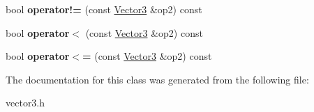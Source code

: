 \begin{DoxyCompactItemize}
\item 
\hypertarget{classpho_1_1Vector3_ab9a92218aa879dd463ef782044527798}{bool {\bfseries operator!=} (const \hyperlink{classpho_1_1Vector3}{Vector3} \&op2) const }\label{classpho_1_1Vector3_ab9a92218aa879dd463ef782044527798}

\item 
\hypertarget{classpho_1_1Vector3_ac5bb55b238f78040d7668d3d484deaab}{bool {\bfseries operator$<$} (const \hyperlink{classpho_1_1Vector3}{Vector3} \&op2) const }\label{classpho_1_1Vector3_ac5bb55b238f78040d7668d3d484deaab}

\item 
\hypertarget{classpho_1_1Vector3_ac5ef1a635321a3490dddcd74a71807dc}{bool {\bfseries operator$<$=} (const \hyperlink{classpho_1_1Vector3}{Vector3} \&op2) const }\label{classpho_1_1Vector3_ac5ef1a635321a3490dddcd74a71807dc}

\end{DoxyCompactItemize}


The documentation for this class was generated from the following file\-:\begin{DoxyCompactItemize}
\item 
vector3.\-h\end{DoxyCompactItemize}
